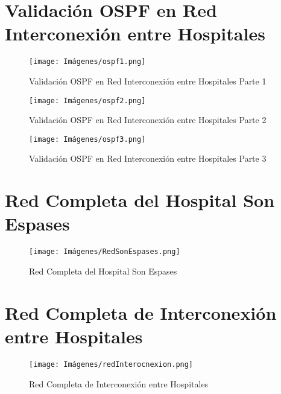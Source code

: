 \section{Validación OSPF en Red Interconexión entre Hospitales}\label{anexo:ospfinter}
\begin{figure}[H]
    \centering
    \texttt{[image: Imágenes/ospf1.png]}
    \caption{Validación OSPF en Red Interconexión entre Hospitales Parte 1}
\end{figure}
\begin{figure}[H]
    \centering
    \texttt{[image: Imágenes/ospf2.png]}
    \caption{Validación OSPF en Red Interconexión entre Hospitales Parte 2}
    \label{fig:interconexion}
\end{figure}
\begin{figure}[H]
    \centering
    \texttt{[image: Imágenes/ospf3.png]}
    \caption{Validación OSPF en Red Interconexión entre Hospitales Parte 3}
    \label{fig:interconexion}
\end{figure}

\section{Red Completa del Hospital Son Espases}\label{anexo:redcompletasonespas}
\begin{figure}[H]
    \centering
    \texttt{[image: Imágenes/RedSonEspases.png]}
    \caption{Red Completa del Hospital Son Espases}
    \label{fig:SonEspases}
\end{figure}
\section{Red Completa de Interconexión entre Hospitales}\label{anexo:redcompletahosp}
\begin{figure}[H]
    \centering
    \texttt{[image: Imágenes/redInterocnexion.png]}
    \caption{Red Completa de Interconexión entre Hospitales}
    \label{fig:interconexion}
\end{figure}

